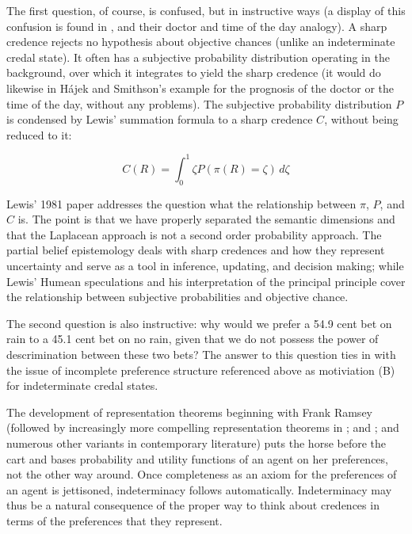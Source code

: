 \documentclass[11pt]{article}
\begin{document}
The first question, of course, is confused, but in instructive ways (a
display of this confusion is found in ,
and their doctor and time of the day analogy). A sharp credence
rejects no hypothesis about objective chances (unlike an indeterminate
credal state). It often has a subjective probability distribution
operating in the background, over which it integrates to yield the
sharp credence (it would do likewise in H{\'a}jek and Smithson's
example for the prognosis of the doctor or the time of the day,
without any problems). The subjective probability distribution $P$ is
condensed by Lewis' summation formula to a sharp credence $C$, without
being reduced to it:

\begin{equation}
  \label{eq:s2}
  C(R)=\int_{0}^{1}\zeta{}P(\pi(R)=\zeta)\,d\zeta
\end{equation}

Lewis' 1981 paper 
addresses the question what the relationship between $\pi$, $P$, and
$C$ is. The point is that we have properly separated the semantic
dimensions and that the Laplacean approach is not a second order
probability approach. The partial belief epistemology deals with sharp
credences and how they represent uncertainty and serve as a tool in
inference, updating, and decision making; while Lewis' Humean
speculations and his interpretation of the principal principle cover
the relationship between subjective probabilities and objective
chance.

The second question is also instructive: why would we prefer a 54.9
cent bet on rain to a 45.1 cent bet on no rain, given that we do not
possess the power of descrimination between these two bets? The answer
to this question ties in with the issue of incomplete preference
structure referenced above as motiviation (B) for indeterminate credal
states. 

The development of representation theorems beginning with Frank Ramsey
(followed by increasingly more compelling representation theorems in
; and ; and numerous other
variants in contemporary literature) puts the horse before the cart
and bases probability and utility functions of an agent on her
preferences, not the other way around. Once completeness as an axiom
for the preferences of an agent is jettisoned, indeterminacy follows
automatically. Indeterminacy may thus be a natural consequence of the
proper way to think about credences in terms of the preferences that
they represent.
\end{document}
